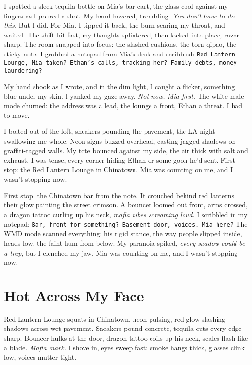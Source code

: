 \documentclass[12pt]{article}
\newcommand{\note}[1]{\texttt{#1}}
\begin{document}
I spotted a sleek tequila bottle on \textnormal{Mia}’s bar cart, the glass cool against my fingers as I poured a shot. My hand hovered, trembling. \textit{You don’t have to do this.} But I did. For \textnormal{Mia}. I tipped it back, the burn searing my throat, and waited. The shift hit fast, my thoughts splintered, then locked into place, razor-sharp. The room snapped into focus: the slashed cushions, the torn qipao, the sticky note. I grabbed a notepad from \textnormal{Mia}’s desk and scribbled: \note{Red Lantern Lounge, Mia taken? Ethan’s calls, tracking her? Family debts, money laundering?}

My hand shook as I wrote, and in the dim light, I caught a flicker, something blue under my skin. I yanked my gaze away. \textit{Not now. Mia first.} The white male mode churned: the address was a lead, the lounge a front, \textnormal{Ethan} a threat. I had to move.

I bolted out of the loft, sneakers pounding the pavement, the LA night swallowing me whole. Neon signs buzzed overhead, casting jagged shadows on graffiti-tagged walls. My tote bounced against my side, the air thick with salt and exhaust. I was tense, every corner hiding \textnormal{Ethan} or some goon he’d sent. First stop: the Red Lantern Lounge in Chinatown. \textnormal{Mia} was counting on me, and I wasn’t stopping now.

First stop: the Chinatown bar from the note. It crouched behind red lanterns, their glow painting the street crimson. A bouncer loomed out front, arms crossed, a dragon tattoo curling up his neck, \textit{mafia vibes screaming loud.} I scribbled in my notepad: \note{Bar, front for something? Basement door, voices. Mia here?} The WMD mode scanned everything: his rigid stance, the way people slipped inside, heads low, the faint hum from below. My paranoia spiked, \textit{every shadow could be a trap}, but I clenched my jaw. \textnormal{Mia} was counting on me, and I wasn’t stopping now.

\section{Hot Across My Face}

Red Lantern Lounge squats in Chinatown, neon pulsing, red glow slashing shadows across wet pavement. Sneakers pound concrete, tequila cuts every edge sharp. Bouncer hulks at the door, dragon tattoo coils up his neck, scales flash like a blade. \textit{Mafia mark.} I shove in, eyes sweep fast: smoke hangs thick, glasses clink low, voices mutter tight.
\end{document}
